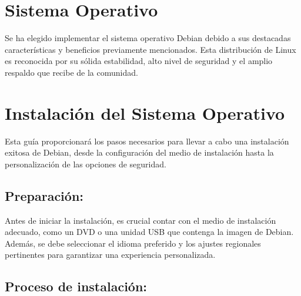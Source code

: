 		
	\section{Sistema Operativo}
				
	Se ha elegido implementar el sistema operativo Debian debido a sus destacadas características y beneficios previamente mencionados. Esta distribución de Linux es reconocida por su sólida estabilidad, alto nivel de seguridad y el amplio respaldo que recibe de la comunidad.\par
	

		
	\section{Instalación del Sistema Operativo}\label{install}
			
		Esta guía proporcionará los pasos necesarios para llevar a cabo una instalación exitosa de Debian, desde la configuración del medio de instalación hasta la personalización de las opciones de seguridad.\par

	
		\subsection{Preparación:}\label{preparación}
		
		 Antes de iniciar la instalación, es crucial contar con el medio de instalación adecuado, como un DVD o una unidad USB que contenga la imagen de Debian. Además, se debe seleccionar el idioma preferido y los ajustes regionales pertinentes para garantizar una experiencia personalizada.\par

		\subsection{Proceso de instalación:}\label{proceso de instalacion}

